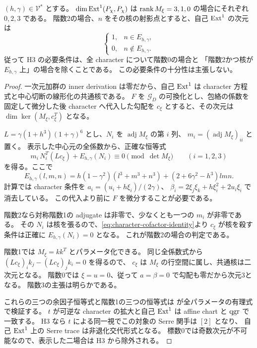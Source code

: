 \begin{proposition}[全係数のcharacter自己Ext判定]
\label{prop:character-odd-ext}
$(h,\gamma)\in\mathcal V^*$ とする。
$\dim\operatorname{Ext}^1(P_\chi,P_\chi)$ は $\operatorname{rank} M_\xi=3,1,0$ の場合にそれぞれ $0,2,3$ である。
階数2の場合、$n$ をその核の射影点とすると、自己 $\operatorname{Ext}^1$ の次元は
\[
 \begin{cases}1,&n\in E_{h,\gamma},\\0,&n\notin E_{h,\gamma}.
 \end{cases}
\]
従って H3 の必要条件は、全 character について階数0の場合と
「階数2かつ核が $E_{h,\gamma}$ 上」の場合を除くことである。
この必要条件の十分性は主張しない。
\end{proposition}
\begin{proof}
一次元加群の inner derivation は零だから、自己 $\operatorname{Ext}^1$ は
character 方程式と中心切断の線形化の共通核である。
$F$ を $\mathcal G_D$ の可換化とし、包絡の係数を固定して微分した後
character へ代入した勾配を $c_\xi$ とすると、その次元は
$\dim\ker(M_\xi,c_\xi^T)$ となる。

$L=\gamma(1+h^3)(1+\gamma)^6$ とし、$N_i$ を $\operatorname{adj}M_\xi$ の第 $i$ 列、
$m_i=(\operatorname{adj}M_\xi)_{ii}$ と置く。
表示した中心元の全係数から、正確な恒等式
\begin{equation}\label{eq:character-cofactor-identity}
 m_i\,N_i^T(Lc_\xi)+E_{h,\gamma}(N_i)\equiv0\pmod{\det M_\xi}
 \qquad(i=1,2,3)
\end{equation}
を得る。ここで
\[
 E_{h,\gamma}(l,m,n)=h(1-\gamma^2)(l^3+m^3+n^3)
                     +(2+6\gamma^2-h^3)lmn.
\]
計算では character 条件を
$a_i=(u_i+h\xi_i)/(2\gamma)$、
$\beta_i=2\xi_j\xi_k+h\xi_i^2+2u_i\xi_i$ で消去している。
この代入より前に $F$ を微分することが必要である。

階数2なら対称階数1の adjugate は非零で、少なくとも一つの $m_i$ が非零である。
その $N_i$ は核を張るので、\eqref{eq:character-cofactor-identity}より
$c_\xi$ が核を殺す条件は正確に $E_{h,\gamma}(N_i)=0$ となる。
これが階数2の場合の判定である。

階数1では $M_\xi=kk^T$ とパラメータ化できる。
同じ全係数式から $(Lc_\xi)_ik_j-(Lc_\xi)_jk_i=0$ を得るので、
$c_\xi$ は $M_\xi$ の行空間に属し、共通核は二次元となる。
階数0では $\xi=u=0$、従って $a=\beta=0$ で勾配も零だから次元3となる。
階数3の主張は明らかである。

これらの三つの余因子恒等式と階数1の三つの恒等式は
 が全パラメータの有理式で検証する。
$t$ が可逆な character の拡大と自己 $\operatorname{Ext}^1$ は affine chart と $\operatorname{qgr}$ で一致する。
H3 なら $t$ による同一視でこの対象の Serre 関手は $[2]$ となり、
自己 $\operatorname{Ext}^1$ 上の Serre trace は非退化交代形式となる。
標数0では奇数次元が不可能なので、表示した二場合は H3 から除外される。
\end{proof}

